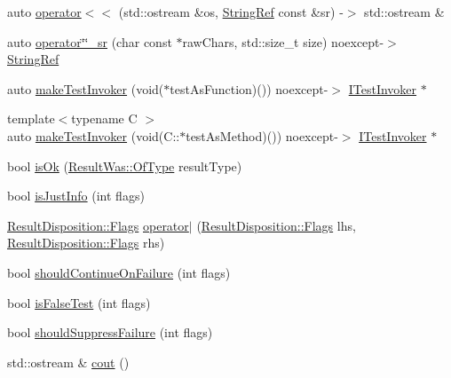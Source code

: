 \begin{DoxyCompactItemize}
\item 
auto \hyperlink{namespace_catch_a5e37b333d756a28e12d44977f063af43}{operator$<$$<$} (std\-::ostream \&os, \hyperlink{class_catch_1_1_string_ref}{String\-Ref} const \&sr) -\/$>$ std\-::ostream \&
\item 
auto \hyperlink{namespace_catch_a15b2f919e23a5da2ab4688cb2b4aa4f4}{operator\char`\"{}\char`\"{}\-\_\-sr} (char const $\ast$raw\-Chars, std\-::size\-\_\-t size) noexcept-\/$>$ \hyperlink{class_catch_1_1_string_ref}{String\-Ref}
\item 
auto \hyperlink{namespace_catch_a180a06841205dfe919dba27b14b0df2e}{make\-Test\-Invoker} (void($\ast$test\-As\-Function)()) noexcept-\/$>$ \hyperlink{struct_catch_1_1_i_test_invoker}{I\-Test\-Invoker} $\ast$
\item 
{\footnotesize template$<$typename C $>$ }\\auto \hyperlink{namespace_catch_ac158f83d2213bf1313e0c52b9ff882a4}{make\-Test\-Invoker} (void(C\-::$\ast$test\-As\-Method)()) noexcept-\/$>$ \hyperlink{struct_catch_1_1_i_test_invoker}{I\-Test\-Invoker} $\ast$
\item 
bool \hyperlink{namespace_catch_a5205869c81c06d3460759cb86676ae68}{is\-Ok} (\hyperlink{struct_catch_1_1_result_was_a624e1ee3661fcf6094ceef1f654601ef}{Result\-Was\-::\-Of\-Type} result\-Type)
\item 
bool \hyperlink{namespace_catch_a54b01af61673a3e1f21f31713639b180}{is\-Just\-Info} (int flags)
\item 
\hyperlink{struct_catch_1_1_result_disposition_a3396cad6e2259af326b3aae93e23e9d8}{Result\-Disposition\-::\-Flags} \hyperlink{namespace_catch_ab32a083e442cc09f736327d2e2865999}{operator$\vert$} (\hyperlink{struct_catch_1_1_result_disposition_a3396cad6e2259af326b3aae93e23e9d8}{Result\-Disposition\-::\-Flags} lhs, \hyperlink{struct_catch_1_1_result_disposition_a3396cad6e2259af326b3aae93e23e9d8}{Result\-Disposition\-::\-Flags} rhs)
\item 
bool \hyperlink{namespace_catch_a7f7480b15d74965459c844f0d393ed87}{should\-Continue\-On\-Failure} (int flags)
\item 
bool \hyperlink{namespace_catch_a93ef4e3e307a2021ca0d41b32c0e54b0}{is\-False\-Test} (int flags)
\item 
bool \hyperlink{namespace_catch_ab91eb13081203d634fe48d3d2ab386d7}{should\-Suppress\-Failure} (int flags)
\item 
std\-::ostream \& \hyperlink{namespace_catch_a50af73c5a37ad5c6558df4ce4a275e83}{cout} ()
\item 

\end{DoxyCompactItemize}
